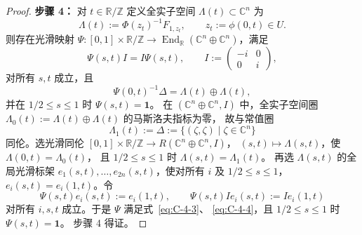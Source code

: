 \begin{proof}
\noindent\textbf{步骤 4：} 对 $t\in\mathbb R/\mathbb Z$ 定义全实子空间
$\Lambda(t)\subset\mathbb C^n$ 为
\[
  \Lambda(t):=\Phi(z_t)^{-1}F_{1,z_t},\qquad z_t:=\phi(0,t)\in U.
\]
则存在光滑映射
$\Psi:[0,1]\times\mathbb R/\mathbb Z\to
  \operatorname{End}_{\mathbb R}(\mathbb C^n\oplus\mathbb C^n)$，满足
\begin{equation}\label{eq:C-4-3}
  \Psi(s,t)I=I\Psi(s,t),\qquad
  I:=\begin{pmatrix}-i&0\\0&i\end{pmatrix},
\end{equation}
对所有 $s,t$ 成立，且
\begin{equation}\label{eq:C-4-4}
  \Psi(0,t)^{-1}\Delta=\Lambda(t)\oplus\Lambda(t),
\end{equation}
并在 $1/2\le s\le1$ 时 $\Psi(s,t)=\mathbf 1$。
在 $(\mathbb C^n\oplus\mathbb C^n,I)$ 中，全实子空间圈
$\Lambda_0(t):=\Lambda(t)\oplus\Lambda(t)$ 的马斯洛夫指标为零，
故与常值圈
\[
  \Lambda_1(t):=\Delta:=\{(\zeta,\zeta)\mid\zeta\in\mathbb C^n\}
\]
同伦。选光滑同伦
$[0,1]\times\mathbb R/\mathbb Z\to R(\mathbb C^n\oplus\mathbb C^n,I)$，
$(s,t)\mapsto\Lambda(s,t)$，使 $\Lambda(0,t)=\Lambda_0(t)$，
且 $1/2\le s\le1$ 时 $\Lambda(s,t)=\Lambda_1(t)$。
再选 $\Lambda(s,t)$ 的全局光滑标架
$e_1(s,t),\ldots,e_{2n}(s,t)$，使对所有 $i$ 及 $1/2\le s\le1$，
$e_i(s,t)=e_i(1,t)$。令
\[
  \Psi(s,t)e_i(s,t):=e_i(1,t),\qquad
  \Psi(s,t)Ie_i(s,t):=Ie_i(1,t)
\]
对所有 $i,s,t$ 成立。于是 $\Psi$ 满足式~\eqref{eq:C-4-3}、
\eqref{eq:C-4-4}，且 $1/2\le s\le1$ 时 $\Psi(s,t)=\mathbf1$。
步骤 4 得证。


\end{proof}
